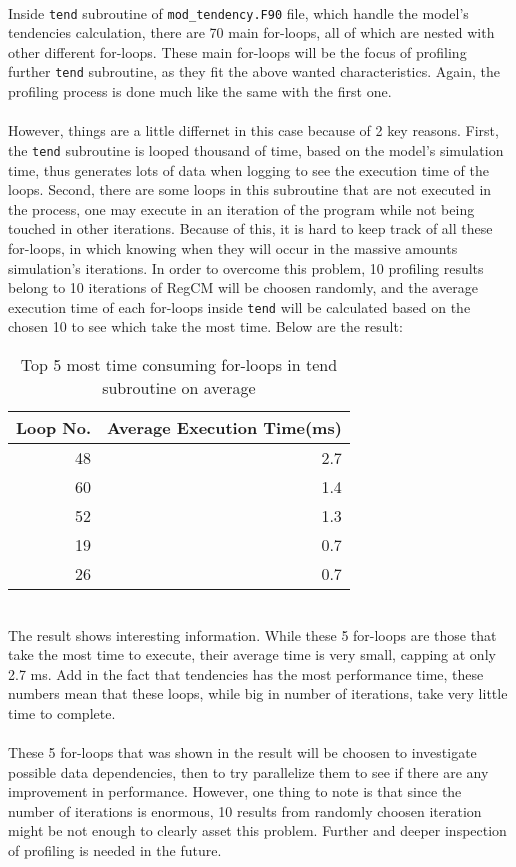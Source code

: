 ~\\
Inside \verb|tend| subroutine of \verb|mod_tendency.F90| file, which handle the model's tendencies calculation, there are 70 main for-loops, all of which are nested with other different for-loops. These main for-loops will be the focus of profiling further \verb|tend| subroutine, as they fit the above wanted characteristics. Again, the profiling process is done much like the same with the first one. \\
~\\
However, things are a little differnet in this case because of 2 key reasons. First, the \verb|tend| subroutine is looped thousand of time, based on the model's simulation time, thus generates lots of data when logging to see the execution time of the loops. Second, there are some loops in this subroutine that are not executed in the process, one may execute in an iteration of the program while not being touched in other iterations. Because of this, it is hard to keep track of all these for-loops, in which knowing when they will occur in the massive amounts simulation's iterations. In order to overcome this problem, 10 profiling results belong to 10 iterations of RegCM will be choosen randomly, and the average execution time of each for-loops inside \verb|tend| will be calculated based on the chosen 10 to see which take the most time. Below are the result: \\
\begin{table}[H]
\centering
\begin{tabular}{@{}rr@{}}
\toprule
Loop No. & Average Execution Time(ms) \\ \midrule
48       & 2.7                        \\
60       & 1.4                        \\
52       & 1.3                        \\
19       & 0.7                        \\
26       & 0.7                        \\ \bottomrule
\end{tabular}%
\caption{Top 5 most time consuming for-loops in tend subroutine on average}
\end{table}
~\\
The result shows interesting information. While these 5 for-loops are those that take the most time to execute, their average time is very small, capping at only 2.7 ms. Add in the fact that tendencies has the most performance time, these numbers mean that these loops, while big in number of iterations, take very little time to complete. \\
~\\
These 5 for-loops that was shown in the result will be choosen to investigate possible data dependencies, then to try parallelize them to see if there are any improvement in performance. However, one thing to note is that since the number of iterations is enormous, 10 results from randomly choosen iteration might be not enough to clearly asset this problem. Further and deeper inspection of profiling is needed in the future. \\

